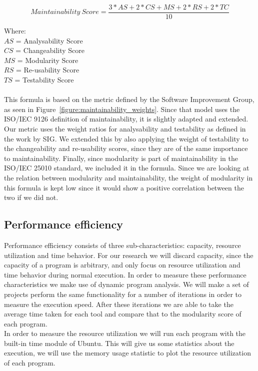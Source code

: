 \documentclass[twoside]{uva-inf-bachelor-thesis}
\begin{document}
\[ Maintainability\ Score = \dfrac{3 * AS + 2 * CS + MS + 2 * RS + 2 * TC}{10} \]

Where:\\
$AS$ = Analysability Score\\
$CS$ = Changeability Score\\
$MS$ = Modularity Score\\
$RS$ = Re-usability Score\\
$TS$ = Testability Score\\
\\
This formula is based on the metric defined by the Software Improvement Group, as seen in Figure~\ref{figure:maintainability_weights}. Since that model uses the ISO/IEC 9126 definition of maintainability, it is slightly adapted and extended. Our metric uses the weight ratios for analysability and testability as defined in the work by SIG. We extended this by also applying the weight of testability to the changeability and re-usability scores, since they are of the same importance to maintainability. Finally, since modularity is part of maintainability in the ISO/IEC 25010 standard, we included it in the formula. Since we are looking at the relation between modularity and maintainability, the weight of modularity in this formula is kept low since it would show a positive correlation between the two if we did not.

\subsection{Performance efficiency}
\label{method:performance}
Performance efficiency consists of three sub-characteristics: capacity, resource utilization and time behavior. For our research we will discard capacity, since the capacity of a program is arbitrary, and only focus on resource utilization and time behavior during normal execution. In order to measure these performance characteristics we make use of dynamic program analysis. We will make a set of projects perform the same functionality for a number of iterations in order to measure the execution speed. After these iterations we are able to take the average time taken for each tool and compare that to the modularity score of each program.\\

In order to measure the resource utilization we will run each program with the built-in time module of Ubuntu. This will give us some statistics about the execution, we will use the memory usage statistic to plot the resource utilization of each program.
\end{document}
